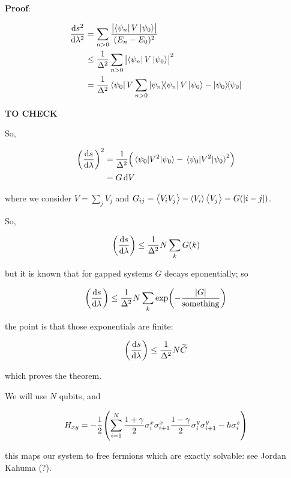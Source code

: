 \documentclass[main_zanardi.tex]{subfiles}
\begin{document}
\begin{greenbox}
  \textbf{Proof}:

  \begin{subequations}
  \begin{align}
    \dv{s^2}{\lambda^2}  &= \sum _{n>0}  \frac{\abs{\bra{\psi_n} V \ket{\psi_0}}}{(E_n - E_0)^2}  \\
    &\leq \frac{1}{\Delta^2} \sum _{n>0} \abs{\bra{\psi_n} V \ket{\psi_0}}^2  \\
    &=  \frac{1}{\Delta^2} \bra{\psi_0} V   \sum _{n>0} \dyad{\psi_n} V \ket{\psi_0}
      - \ketbra{\psi_0}{\psi_0}
  \end{align}
  \end{subequations}

  \textbf{TO CHECK}

  So,

  \begin{subequations}
  \begin{align}
    \qty(\dv{s}{\lambda})^2  &=  \frac{1}{\Delta^2} \qty(\ev{V^2}{\psi_0} - \ev{V^2}{\psi_0}^2)  \\
    &= G \dd{V}
  \end{align}
  \end{subequations}

  where we consider \(V = \sum _{j}  V_j \) and \(G _{ij} = \expval{V_i V_j} - \expval{V_i} \expval{V_j} = G(\abs{i-j} ) \).

  So,

  \begin{equation}
    \qty(\dv{s}{\lambda} ) \leq \frac{1}{\Delta^2} N \sum _{k} G(k)
  \end{equation}

  but it is known that for gapped systems \(G\) decays eponentially; so

  \begin{equation}
    \qty(\dv{s}{\lambda} ) \leq \frac{1}{\Delta^2} N \sum _{k} \exp(-\frac{\abs{G}}{\text{something}}  )
  \end{equation}

  the point is that those exponentials are finite:

  \begin{equation}
    \qty(\dv{s}{\lambda} ) \leq \frac{1}{\Delta^2} N \widetilde{C}
  \end{equation}

  which proves the theorem.
\end{greenbox}

We will use \(N\) qubits, and

\begin{equation}
  H_{xy} = -\frac{1}{2} \qty(\sum _{i=1}   ^{N} \frac{1 + \gamma}{2} \sigma_i ^x \sigma_{i+1}^x \frac{1-\gamma}{2} \sigma^y_i \sigma_{i+1}^y - h \sigma_i^{z} )
\end{equation}

this maps our system to free fermions which are exactly solvable: see Jordan Kahuma (?).
\end{document}
